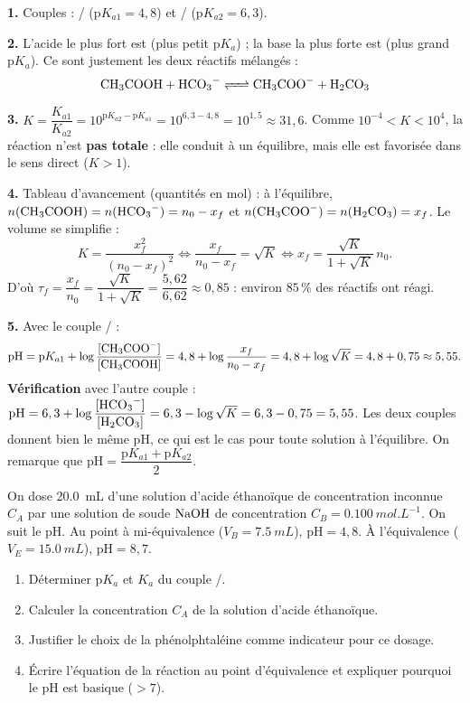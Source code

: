 \documentclass[11pt]{article}
\begin{document}
\begin{corrige}
\textbf{1.} Couples : / ($\mathrm{p}K_{a1}=4,8$) et / ($\mathrm{p}K_{a2}=6,3$).
\par\textbf{2.} L'acide le plus fort est  (plus petit $\mathrm{p}K_a$) ; la base la plus forte est  (plus grand $\mathrm{p}K_a$). Ce sont justement les deux réactifs mélangés :
\[ \ce{CH3COOH + HCO3- <=> CH3COO- + H2CO3} \]
\par\textbf{3.} $K = \dfrac{K_{a1}}{K_{a2}} = 10^{\mathrm{p}K_{a2} - \mathrm{p}K_{a1}} = 10^{6,3 - 4,8} = 10^{1,5} \approx 31,6$.
Comme $10^{-4} < K < 10^{4}$, la réaction n'est \textbf{pas totale} : elle conduit à un équilibre, mais elle est favorisée dans le sens direct ($K>1$).
\par\textbf{4.} Tableau d'avancement (quantités en mol) : à l'équilibre, $n(\ce{CH3COOH}) = n(\ce{HCO3-}) = n_0 - x_f$ et $n(\ce{CH3COO-}) = n(\ce{H2CO3}) = x_f$. Le volume se simplifie :
\[ K = \frac{x_f^2}{(n_0 - x_f)^2} \iff \frac{x_f}{n_0 - x_f} = \sqrt{K} \iff x_f = \frac{\sqrt{K}}{1+\sqrt{K}}\,n_0. \]
D'où $\tau_f = \dfrac{x_f}{n_0} = \dfrac{\sqrt{K}}{1+\sqrt{K}} = \dfrac{5,62}{6,62} \approx 0,85$ : environ $85\,\%$ des réactifs ont réagi.
\par\textbf{5.} Avec le couple / :
\[ \mathrm{pH} = \mathrm{p}K_{a1} + \log\frac{[\ce{CH3COO-}]}{[\ce{CH3COOH}]} = 4,8 + \log\frac{x_f}{n_0 - x_f} = 4,8 + \log\sqrt{K} = 4,8 + 0,75 \approx 5,55. \]
\textbf{Vérification} avec l'autre couple : $\mathrm{pH} = 6,3 + \log\dfrac{[\ce{HCO3-}]}{[\ce{H2CO3}]} = 6,3 - \log\sqrt{K} = 6,3 - 0,75 = 5,55$. Les deux couples donnent bien le même pH, ce qui est le cas pour toute solution à l'équilibre. On remarque que $\mathrm{pH} = \dfrac{\mathrm{p}K_{a1} + \mathrm{p}K_{a2}}{2}$.
\end{corrige}

\begin{exercice}
On dose \SI{20,0}{mL} d'une solution d'acide éthanoïque de concentration inconnue $C_A$ par une solution de soude $\ce{NaOH}$ de concentration $C_B = \SI{0,100}{mol.L^{-1}}$. On suit le pH. Au point à mi-équivalence ($V_B = \SI{7,5}{mL}$), $\mathrm{pH} = 4,8$. À l'équivalence ($V_E = \SI{15,0}{mL}$), $\mathrm{pH} = 8,7$.
\begin{enumerate}
\item Déterminer $\mathrm{p}K_a$ et $K_a$ du couple /.
\item Calculer la concentration $C_A$ de la solution d'acide éthanoïque.
\item Justifier le choix de la phénolphtaléine comme indicateur pour ce dosage.
\item Écrire l'équation de la réaction au point d'équivalence et expliquer pourquoi le pH est basique ($>7$).
\end{enumerate}
\end{exercice}
\end{document}
